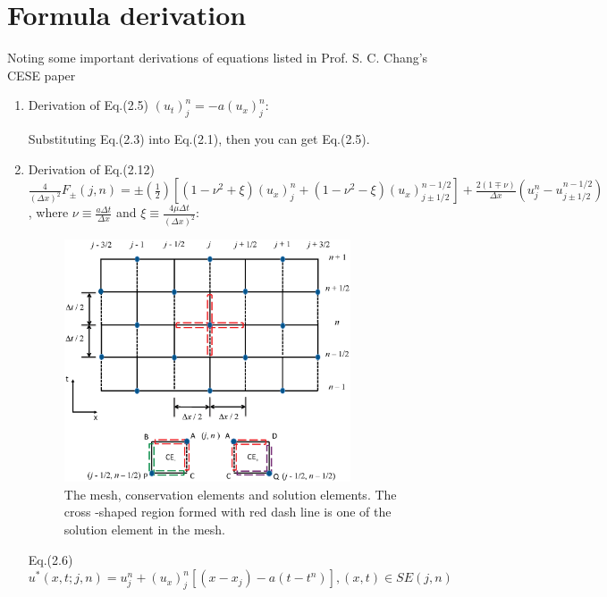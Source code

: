 \documentclass[a4paper,12pt,dvips]{article}
\begin{document}
\section{Formula derivation}
 \label{sec:formula_derivation}
Noting some important derivations of equations listed in Prof. S. C. Chang's 
CESE paper~\cite{CESE_Shin_Chung_Chang_1995}
 \begin{enumerate}
  \item Derivation of Eq.(2.5) $(u_t)^n_j = -a(u_x)^n_j$:

    \hspace{4mm}Substituting Eq.(2.3) into Eq.(2.1), then you can get Eq.(2.5).

  \item Derivation of Eq.(2.12) \newline
    $\frac{4}{(\Delta x)^{2}}F_{\pm}(j, n)=
    \pm(\frac{1}{2})[(1-\nu^{2}+\xi)(u_{x})^{n}_{j}
    +(1-\nu^{2}-\xi)(u_{x})^{n-1/2}_{j\pm1/2}]
    +\frac{2(1\mp\nu)}{\Delta x}(u^{n}_{j}-u^{n-1/2}_{j\pm1/2})$, 
    where $\nu\equiv\frac{a\Delta t}{\Delta x}$ 
    and $\xi\equiv\frac{4\mu\Delta t}{(\Delta x)^{2}}$:
    \begin{figure}[hbtp]
     \centering
      \includegraphics[width=0.8\textwidth]{mesh_and_ce_se_v1.eps}
      \caption{The mesh, conservation elements and solution elements. The cross
               -shaped region formed with red dash line is one of the solution 
               element in the mesh.}
     \label{fig:mesh_and_ce_se_v1}
    \end{figure}

    \hspace{4mm}Eq.(2.6) $u^{*}(x,t;j,n)=u^{n}_{j}+(u_{x})^{n}_{j}[(x-x_{j})
                         -a(t-t^{n})], (x,t)\in SE(j,n)$


\end{enumerate}
\end{document}
